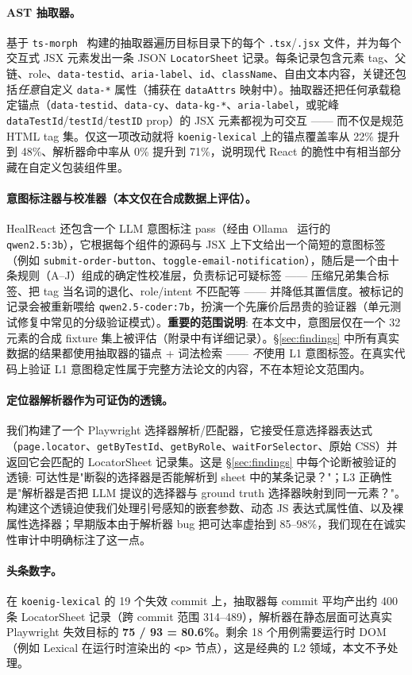 \paragraph{AST 抽取器。}
基于 \texttt{ts-morph}~\cite{tsmorph} 构建的抽取器遍历目标目录下的每个 \texttt{.tsx}/\texttt{.jsx} 文件，并为每个交互式 JSX 元素发出一条 JSON \texttt{LocatorSheet} 记录。每条记录包含元素 tag、父链、role、\texttt{data-testid}、\texttt{aria-label}、\texttt{id}、\texttt{className}、自由文本内容，关键还包括\emph{任意}自定义 \texttt{data-*} 属性（捕获在 \texttt{dataAttrs} 映射中）。抽取器还把任何承载稳定锚点（\texttt{data-testid}、\texttt{data-cy}、\texttt{data-kg-*}、\texttt{aria-label}，或驼峰 \texttt{dataTestId}/\texttt{testId}/\texttt{testID} prop）的 JSX 元素都视为可交互 —— 而不仅是规范 HTML tag 集。仅这一项改动就将 \texttt{koenig-lexical} 上的锚点覆盖率从 22\% 提升到 48\%、解析器命中率从 0\% 提升到 71\%，说明现代 React 的脆性中有相当部分藏在自定义包装组件里。

\paragraph{意图标注器与校准器（本文仅在合成数据上评估）。}
HealReact 还包含一个 LLM 意图标注 pass（经由 Ollama~\cite{ollama} 运行的 \texttt{qwen2.5:3b}），它根据每个组件的源码与 JSX 上下文给出一个简短的意图标签（例如 \texttt{submit-order-button}、\texttt{toggle-email-notification}），随后是一个由十条规则（A--J）组成的确定性校准层，负责标记可疑标签 —— 压缩兄弟集合标签、把 tag 当名词的退化、role/intent 不匹配等 —— 并降低其置信度。被标记的记录会被重新喂给 \texttt{qwen2.5-coder:7b}，扮演一个先廉价后昂贵的验证器（单元测试修复中常见的分级验证模式）。\textbf{重要的范围说明}: 在本文中，意图层仅在一个 32 元素的合成 fixture 集上被评估（附录中有详细记录）。\S\ref{sec:findings} 中所有真实数据的结果都使用抽取器的锚点 + 词法检索 —— \emph{不}使用 L1 意图标签。在真实代码上验证 L1 意图稳定性属于完整方法论文的内容，不在本短论文范围内。

\paragraph{定位器解析器作为可证伪的透镜。}
我们构建了一个 Playwright 选择器解析/匹配器，它接受任意选择器表达式（\texttt{page.locator}、\texttt{getByTestId}、\texttt{getByRole}、\texttt{waitForSelector}、原始 CSS）并返回它会匹配的 LocatorSheet 记录集。这是 \S\ref{sec:findings} 中每个论断被验证的透镜: 可达性是"断裂的选择器是否能解析到 sheet 中的某条记录？"；L3 正确性是"解析器是否把 LLM 提议的选择器与 ground truth 选择器映射到同一元素？"。构建这个透镜迫使我们处理引号感知的嵌套参数、动态 JS 表达式属性值、以及裸属性选择器；早期版本由于解析器 bug 把可达率虚抬到 85--98\%，我们现在在诚实性审计中明确标注了这一点。

\paragraph{头条数字。}
在 \texttt{koenig-lexical} 的 19 个失效 commit 上，抽取器每 commit 平均产出约 400 条 LocatorSheet 记录（跨 commit 范围 314--489），解析器在静态层面可达真实 Playwright 失效目标的 \textbf{75 / 93 = 80.6\%}。剩余 18 个用例需要运行时 DOM（例如 Lexical 在运行时渲染出的 \texttt{<p>} 节点），这是经典的 L2 领域，本文不予处理。
